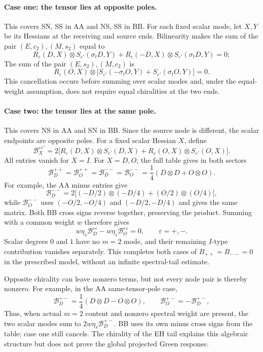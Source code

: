 \documentclass[a4paper,11pt]{article}
\numberwithin{equation}{section}
\theoremstyle{definition}
\begin{document}
\paragraph{Case one: the tensor lies at opposite poles.}
This covers SN, SS in AA and NS, SS in BB. For each fixed scalar mode, let $X,Y$ be its Hessians at the receiving and source ends. Bilinearity makes the sum of the pair $(E,c_2),(M,s_2)$ equal to
\[
R_\varepsilon(D,X)\otimes S_{\varepsilon'}(\sigma_tD,Y)
+R_\varepsilon(-D,X)\otimes S_{\varepsilon'}(\sigma_tD,Y)=0;
\]
The sum of the pair $(E,s_2),(M,c_2)$ is
\[
R_\varepsilon(O,X)\otimes
\bigl[S_{\varepsilon'}(-\sigma_tO,Y)+S_{\varepsilon'}(\sigma_tO,Y)\bigr]=0.
\]
This cancellation occurs before summing over scalar modes and, under the equal-weight assumption, does not require equal chiralities at the two ends.

\paragraph{Case two: the tensor lies at the same pole.}
This covers NS in AA and SN in BB. Since the source node is different, the scalar endpoints are opposite poles. For a fixed scalar Hessian $X$, define
\[
\mathcal B_X^{\varepsilon\varepsilon'}=
2\bigl[R_\varepsilon(D,X)\otimes S_{\varepsilon'}(D,X)
+R_\varepsilon(O,X)\otimes S_{\varepsilon'}(O,X)\bigr].
\]
All entries vanish for $X=I$. For $X=D,O$, the full table gives in both sectors
\begin{equation}\label{eq:samechiralityblocks}
\mathcal B_D^{++}=\mathcal B_O^{++}
=\mathcal B_D^{--}=\mathcal B_O^{--}
=\frac14(D\otimes D+O\otimes O).
\end{equation}
For example, the AA minus entries give
\[
\mathcal B_D^{--}=2\bigl[(-D/2)\otimes(-D/4)
+(O/2)\otimes(O/4)\bigr],
\]
while $\mathcal B_O^{--}$ uses $(-O/2,-O/4)$ and $(-D/2,-D/4)$ and gives the same matrix. Both BB cross signs reverse together, preserving the product. Summing with a common weight $w$ therefore gives
\[
w\eta_s\mathcal B_D^{\varepsilon\varepsilon}
-w\eta_s\mathcal B_O^{\varepsilon\varepsilon}=0,
\qquad\varepsilon=+,-.
\]
Scalar degrees $0$ and $1$ have no $m=2$ mode, and their remaining $I$-type contribution vanishes separately. This completes both cases of $B_{++}=B_{--}=0$ in the prescribed model, without an infinite spectral-tail estimate.

Opposite chirality can leave nonzero terms, but not every node pair is thereby nonzero. For example, in the AA same-tensor-pole case,
\[
\mathcal B_D^{+-}=\frac14(D\otimes D-O\otimes O),\qquad
\mathcal B_O^{+-}=-\mathcal B_D^{+-},
\]
Thus, when actual $m=2$ content and nonzero spectral weight are present, the two scalar modes sum to $2w\eta_s\mathcal B_D^{+-}$. BB uses its own minus cross signs from the table; case one still cancels. The chirality of the EH tail explains this algebraic structure but does not prove the global projected Green response.
\end{document}
